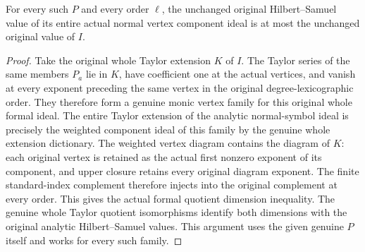 \begin{theorem}
\label{hir:actual-every-analytic-normal-vertex-symbol-hs-bound}
\leanok
For every such $P$ and every order $\ell$, the unchanged original
Hilbert--Samuel value of its entire actual normal vertex component
ideal is at most the unchanged original value of $I$.
\end{theorem}
\begin{proof}
Take the original whole Taylor extension $K$ of $I$. The Taylor series
of the same members $P_a$ lie in $K$, have coefficient one at the actual
vertices, and vanish at every exponent preceding the same vertex in the
original degree-lexicographic order. They therefore form a genuine
monic vertex family for this original whole formal ideal. The entire
Taylor extension of the analytic normal-symbol ideal is precisely the
weighted component ideal of this family by the genuine whole extension
dictionary. The weighted vertex diagram contains the diagram of $K$:
each original vertex is retained as the actual first nonzero exponent
of its component, and upper closure retains every original diagram
exponent. The finite standard-index complement therefore injects into
the original complement at every order. This gives the actual formal
quotient dimension inequality. The genuine whole Taylor quotient
isomorphisms identify both dimensions with the original analytic
Hilbert--Samuel values. This argument uses the given genuine $P$
itself and works for every such family.
\end{proof}

